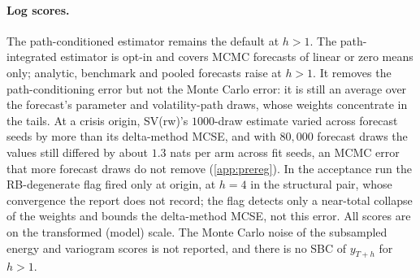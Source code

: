 \paragraph{Log scores.}
The path-conditioned estimator remains the default at $h > 1$. The path-integrated estimator is
opt-in and covers MCMC forecasts of linear or zero means only; analytic, benchmark and pooled
forecasts raise at $h > 1$. %
It removes the path-conditioning error but not the Monte Carlo error: it is still an average over
the forecast's parameter and volatility-path draws, whose weights concentrate in the tails. At a
crisis origin, SV(rw)'s $1000$-draw estimate varied across forecast seeds by more than its
delta-method MCSE, and with $80{,}000$ forecast draws the values still differed by about $1.3$ nats
per arm across fit seeds, an MCMC error that more forecast draws do not remove (\cref{app:prereg}). %
In the acceptance run the RB-degenerate flag fired only at
 origin, 
at $h = 4$ in the structural pair, whose convergence the report does not record; the flag detects
only a near-total collapse of the weights and bounds the delta-method MCSE, not this error. %
All scores are on the transformed (model) scale. The Monte Carlo noise of the subsampled energy and
variogram scores is not reported, and there is no SBC of $y_{T+h}$ for $h > 1$. %


